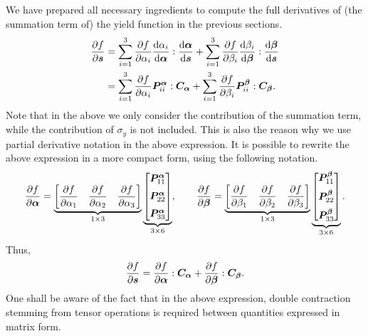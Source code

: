 We have prepared all necessary ingredients to compute the full derivatives of (the summation term of) the yield function in the previous sections.
\begin{gather}
    \begin{split}
        \dfrac{\partial{f}}{\partial{\bm{s}}} & =\sum_{i=1}^{3}\dfrac{\partial{f}}{\partial{\alpha_i}}\dfrac{\mathrm{d}\alpha_i}{\mathrm{d}\bm{\alpha}}:\dfrac{\mathrm{d}\bm{\alpha}}{\mathrm{d}\bm{s}}+\sum_{i=1}^{3}\dfrac{\partial{f}}{\partial{\beta_i}}\dfrac{\mathrm{d}\beta_i}{\mathrm{d}\bm{\beta}}:\dfrac{\mathrm{d}\bm{\beta}}{\mathrm{d}\bm{s}} \\
                        & =\sum_{i=1}^{3}\dfrac{\partial{f}}{\partial{\alpha_i}}\bm{P}_{ii}^{\bm{\alpha}}:\bm{C}_{\bm{\alpha}}+\sum_{i=1}^{3}\dfrac{\partial{f}}{\partial{\beta_i}}\bm{P}_{ii}^{\bm{\beta}}:\bm{C}_{\bm{\beta}}.
    \end{split}
\end{gather}
Note that in the above we only consider the contribution of the summation term, while the contribution of $\sigma_y$ is not included.
This is also the reason why we use partial derivative notation in the above expression.
It is possible to rewrite the above expression in a more compact form, using the following notation.
\begin{gather}
    \dfrac{\partial{f}}{\partial{\bm{\alpha}}}=\underbrace{\begin{bmatrix}
            \dfrac{\partial{f}}{\partial{\alpha_1}} & \dfrac{\partial{f}}{\partial{\alpha_2}} & \dfrac{\partial{f}}{\partial{\alpha_3}}
        \end{bmatrix}}_{1\times3}\underbrace{\begin{bmatrix}
            \bm{P}_{11}^{\bm{\alpha}} \\[2mm]\bm{P}_{22}^{\bm{\alpha}}\\[2mm]\bm{P}_{33}^{\bm{\alpha}}
        \end{bmatrix}}_{3\times6},\qquad
    \dfrac{\partial{f}}{\partial{\bm{\beta}}}=\underbrace{\begin{bmatrix}
            \dfrac{\partial{f}}{\partial{\beta_1}} & \dfrac{\partial{f}}{\partial{\beta_2}} & \dfrac{\partial{f}}{\partial{\beta_3}}
        \end{bmatrix}}_{1\times3}\underbrace{\begin{bmatrix}
            \bm{P}_{11}^{\bm{\beta}} \\[2mm]\bm{P}_{22}^{\bm{\beta}}\\[2mm]\bm{P}_{33}^{\bm{\beta}}
        \end{bmatrix}}_{3\times6}.
\end{gather}
Thus,
\begin{gather}
    \dfrac{\partial{f}}{\partial{\bm{s}}}=\dfrac{\partial{f}}{\partial{\bm{\alpha}}}:\bm{C}_{\bm{\alpha}}+\dfrac{\partial{f}}{\partial{\bm{\beta}}}:\bm{C}_{\bm{\beta}}.
\end{gather}
One shall be aware of the fact that in the above expression, double contraction stemming from tensor operations is required between quantities expressed in matrix form.
